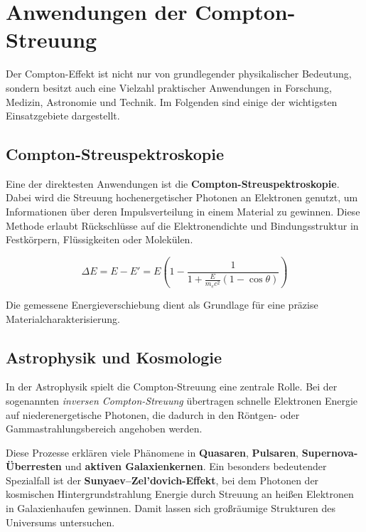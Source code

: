 
\section{Anwendungen der Compton-Streuung}

Der Compton-Effekt ist nicht nur von grundlegender physikalischer Bedeutung,
sondern besitzt auch eine Vielzahl praktischer Anwendungen in Forschung,
Medizin, Astronomie und Technik. Im Folgenden sind einige der wichtigsten
Einsatzgebiete dargestellt.

\subsection{Compton-Streuspektroskopie}
Eine der direktesten Anwendungen ist die \textbf{Compton-Streuspektroskopie}.
Dabei wird die Streuung hochenergetischer Photonen an Elektronen genutzt, um
Informationen über deren Impulsverteilung in einem Material zu gewinnen. 
Diese Methode erlaubt Rückschlüsse auf die Elektronendichte und Bindungsstruktur
in Festkörpern, Flüssigkeiten oder Molekülen.

\[
\Delta E = E - E' = E \left(1 - \frac{1}{1 + \frac{E}{m_e c^2}(1 - \cos \theta)}\right)
\]

Die gemessene Energieverschiebung dient als Grundlage für eine präzise
Materialcharakterisierung.

\subsection{Astrophysik und Kosmologie}
In der Astrophysik spielt die Compton-Streuung eine zentrale Rolle.
Bei der sogenannten \emph{inversen Compton-Streuung} übertragen schnelle Elektronen
Energie auf niederenergetische Photonen, die dadurch in den Röntgen- oder 
Gammastrahlungsbereich angehoben werden. 

Diese Prozesse erklären viele Phänomene in \textbf{Quasaren}, \textbf{Pulsaren}, 
\textbf{Supernova-Überresten} und \textbf{aktiven Galaxienkernen}.
Ein besonders bedeutender Spezialfall ist der \textbf{Sunyaev–Zel’dovich-Effekt}, 
bei dem Photonen der kosmischen Hintergrundstrahlung Energie durch Streuung 
an heißen Elektronen in Galaxienhaufen gewinnen. 
Damit lassen sich großräumige Strukturen des Universums untersuchen.

